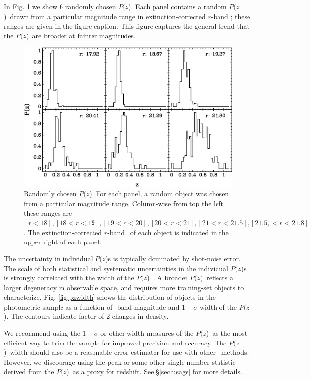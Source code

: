 \documentclass[preprint]{aastex}
\newcommand{\pofz}{$P(z$)}
\begin{document}
In Fig. \ref{fig:rand6pofz} we show 6 randomly chosen \pofz.  Each panel
contains a random \pofz\ drawn from a particular magnitude range in extinction-corrected
$r$-band \cmodelmag; these ranges are given in the figure caption.
This figure captures the general trend that the \pofz\ are broader at
fainter magnitudes.

\begin{figure} [t]\centering
    \includegraphics[scale=0.7]{figures/seed25-5-6pofz.eps}
    \caption{Randomly chosen \pofz.  For each panel, a random object was
    chosen from a particular magnitude range.  Column-wise from top the
    left these ranges are $[r < 18], [18 < r < 19], [19 < r < 20], 
    [20 < r < 21], [21 < r < 21.5], [21.5, < r < 21.8]$.  
    The extinction-corrected $r$-band \cmodelmag\ of each object
    is indicated in the upper right of each panel.
    \label{fig:rand6pofz}}
\end{figure}

The uncertainty in individual \pofz s is typically dominated by shot-noise
error.  The scale of both statistical and systematic uncertainties in the
individual \pofz s is strongly correlated with the width of the \pofz\
\citep{CunhaPhotoz09}.  A broader \pofz\ reflects a larger degeneracy in
observable space, and requires more training-set objects to characterize.  Fig.
\ref{fig:pzwidth} shows the distribution of objects in the photometric sample
as a function of \rmag-band magnitude and $1-\sigma$ width of the \pofz.  The
contours indicate factor of 2 changes in density.  

We recommend using the $1-\sigma$ or other width measures of the \pofz\ as the
most efficient way to trim the sample for improved precision and accuracy.  The
\pofz\ width should also be a reasonable error estimator for use with other
\photoz\ methods.  However, we discourage using the peak or some other single
number statistic derived from the \pofz\ as a proxy for redshift. See 
\S \ref{sec:usage} for more details.

\end{document}
